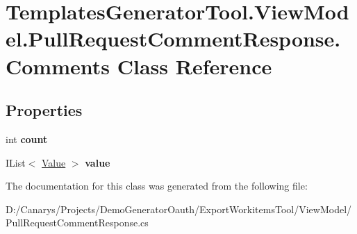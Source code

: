 \hypertarget{class_templates_generator_tool_1_1_view_model_1_1_pull_request_comment_response_1_1_comments}{}\section{Templates\+Generator\+Tool.\+View\+Model.\+Pull\+Request\+Comment\+Response.\+Comments Class Reference}
\label{class_templates_generator_tool_1_1_view_model_1_1_pull_request_comment_response_1_1_comments}
\subsection*{Properties}
\begin{DoxyCompactItemize}
\item 
\mbox{\label{class_templates_generator_tool_1_1_view_model_1_1_pull_request_comment_response_1_1_comments_a3171e063e7c0b6c8ec1aeb3d58c43ca0}} 
int {\bfseries count}
\item 
\mbox{\label{class_templates_generator_tool_1_1_view_model_1_1_pull_request_comment_response_1_1_comments_acdc45cc8d36c91236f72ee21ea4cfe75}} 
I\+List$<$ \mbox{\hyperlink{class_templates_generator_tool_1_1_view_model_1_1_pull_request_comment_response_1_1_value}{Value}} $>$ {\bfseries value}
\end{DoxyCompactItemize}


The documentation for this class was generated from the following file\+:\begin{DoxyCompactItemize}
\item 
D\+:/\+Canarys/\+Projects/\+Demo\+Generator\+Oauth/\+Export\+Workitems\+Tool/\+View\+Model/Pull\+Request\+Comment\+Response.\+cs\end{DoxyCompactItemize}
